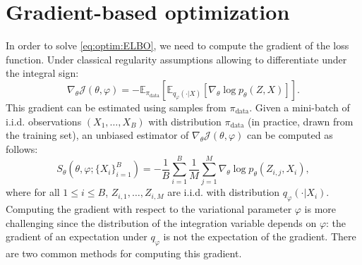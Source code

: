 \documentclass[english,graybox,envcountchap,envcountsame,sectrefs,shortlabels]{svmono}
\theoremstyle{style}
\newcommand{\eqsp}{}
\begin{document}
\section{Gradient-based optimization}
\label{sec:vi:gradients}
In order to solve \eqref{eq:optim:ELBO}, we need to compute the gradient of the loss function. Under classical regularity assumptions allowing to differentiate under the integral sign:
$$
\nabla_{\theta} \mathcal{J}(\theta, \varphi) = -\mathbb{E}_{\pi_{\mathrm{data}}} \left[\mathbb{E}_{q_{\varphi}(\cdot|X)}\left[ \nabla_{\theta} \log p_{\theta}(Z,X)\right]\right]\eqsp.
$$
This gradient can be estimated using samples from $\pi_{\mathrm{data}}$. Given a mini-batch of i.i.d. observations $(X_1,\ldots,X_B)$ with distribution $\pi_{\mathrm{data}}$ (in practice, drawn from the training set), an unbiased estimator of $\nabla_{\theta} \mathcal{J}(\theta, \varphi)$ can be computed as follows:
$$
S_{\theta}(\theta, \varphi;\{X_i\}_{i=1}^B) = -\frac{1}{B}\sum_{i=1}^B\frac{1}{M}\sum_{j=1}^M \nabla_\theta \log p_\theta(Z_{i,j},X_i)\eqsp,
$$
where for all $1\leqslant i \leqslant B$, $Z_{i,1},\ldots, Z_{i,M}$ are i.i.d. with distribution $q_{\varphi}(\cdot|X_i)$.
Computing the gradient with respect to the variational parameter $\varphi$ is more challenging since the distribution of the integration variable depends on $\varphi$: the gradient of an expectation under $q_\varphi$ is not the expectation of the gradient. There are two common methods for computing this gradient.
\end{document}
